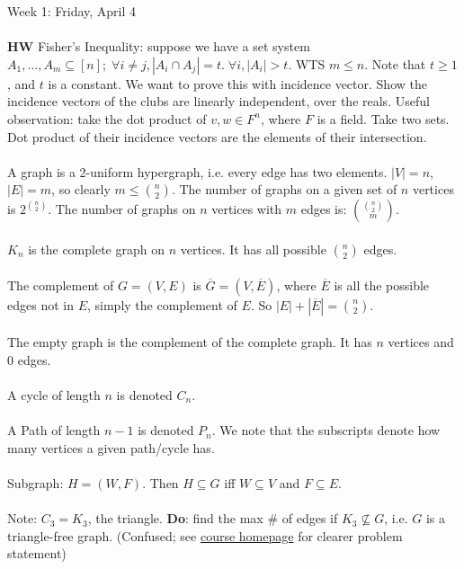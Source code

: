 \documentclass[12pt]{article}
\theoremstyle{remark}
\begin{document}
\begin{section}{Week 1: Friday, April 4}
\\\\\textbf{HW} Fisher's Inequality: suppose we have a set system $A_1,\ldots,A_m \subseteq [n]; \; \forall i \neq j, |A_i \cap A_j| = t. \; \forall i, |A_i| > t.$ WTS $m \leq n$. Note that $t \geq 1$, and $t$ is a constant. We want to prove this with incidence vector. Show the incidence vectors of the clubs are linearly independent, over the reals. Useful observation: take the dot product of $v,w \in F^n$, where $F$ is a field. Take two sets. Dot product of their incidence vectors are the elements of their intersection.
\\\\A graph is a 2-uniform hypergraph, i.e. every edge has two elements. $|V| = n$, $|E| = m$, so clearly $m \leq {n \choose 2}$. The number of graphs on a given set of $n$ vertices is $2^{n \choose 2}$. The number of graphs on $n$ vertices with $m$ edges is: ${{n \choose 2} \choose m}$.
\\\\$K_n$ is the complete graph on $n$ vertices. It has all possible ${n \choose 2}$ edges. 
\\\\The complement of $G=(V,E)$ is $\overline{G} = (V,\overline{E})$, where $\overline{E}$ is all the possible edges not in $E$, simply the complement of $E$. So $|E| + |\overline{E}| = {n \choose 2}$. 
\\\\The empty graph is the complement of the complete graph. It has $n$ vertices and $0$ edges. 
\\\\A cycle of length $n$ is denoted $C_n$. 
\\\\A Path of length $n-1$ is denoted $P_n$. We note that the subscripts denote how many vertices a given path/cycle has.
\\\\Subgraph: $H = (W,F)$. Then $H \subseteq G$ iff $W \subseteq V$ and $F \subseteq E$. 
\\\\Note: $C_3 = K_3$, the triangle. \textbf{Do}: find the max $\#$ of edges if $K_3 \nsubseteq G$, i.e. $G$ is a triangle-free graph. (Confused; see \href{http://people.cs.uchicago.edu/~laci/14comb/index.html}{course homepage} for clearer problem statement)
\end{section}
\newpage
\end{document}
